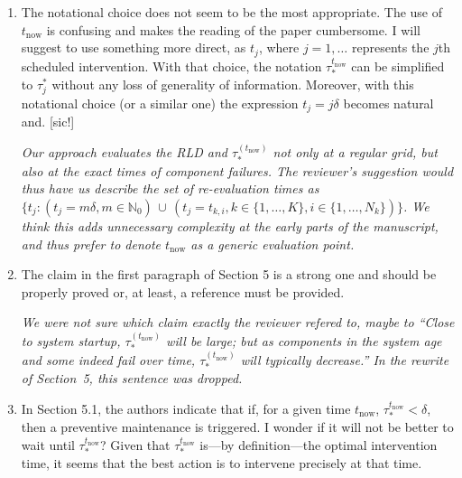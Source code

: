 \documentclass[authoryear]{elsarticle}
\newcommand{\naturals}{\mathbb{N}}
\def\tnow{t_\text{now}}
\newcommand{\tausnow}{\tau_*^{(\tnow)}}
\begin{document}
\begin{enumerate}
\item The notational choice does not seem to be the most appropriate. The use of $\tnow$ is confusing and makes the reading of the paper cumbersome. I will suggest to use something more direct, as $t_j$, where $j=1,\ldots$ represents the $j$th scheduled intervention. With that choice, the notation $\tau^{\tnow}_*$ can be simplified to $\tau^*_j$ without any loss of generality of information. Moreover, with this notational choice (or a similar one) the expression $t_j=j \delta$ becomes natural and. [sic!]

\smallskip

\emph{Our approach evaluates the RLD and $\tausnow$ not only at a regular grid,
but also at the exact times of component failures.
The reviewer's suggestion would thus have us describe the set of re-evaluation times as
$\big\{ t_j: (t_j = m\delta, m \in \naturals_0) \,\cup\, (t_j = t_{k,i}, k \in \{1,\ldots,K\}, i \in \{1,\ldots, N_k\}) \big\}$.
We think this adds unnecessary complexity at the early parts of the manuscript,
and thus prefer to denote $\tnow$ as a generic evaluation point.}

\item The claim in the first paragraph of Section 5 is a strong one and should be properly proved or, at least, a reference must be provided.

\smallskip

\emph{We were not sure which claim exactly the reviewer refered to, maybe to
``Close to system startup, $\tausnow$ will be large;
but as components in the system age and some indeed fail over time, $\tausnow$ will typically decrease.''
In the rewrite of Section~5, this sentence was dropped.}

\item In Section 5.1, the authors indicate that if, for a given time $\tnow$, $\tau_*^{\tnow}<\delta$, then a preventive maintenance is triggered. I wonder if it will not be better to wait until $\tau_*^{\tnow}$? Given that $\tau_*^{\tnow}$ is---by definition---the optimal intervention time, it seems that the best action is to intervene precisely at that time.


\end{enumerate}
\end{document}
